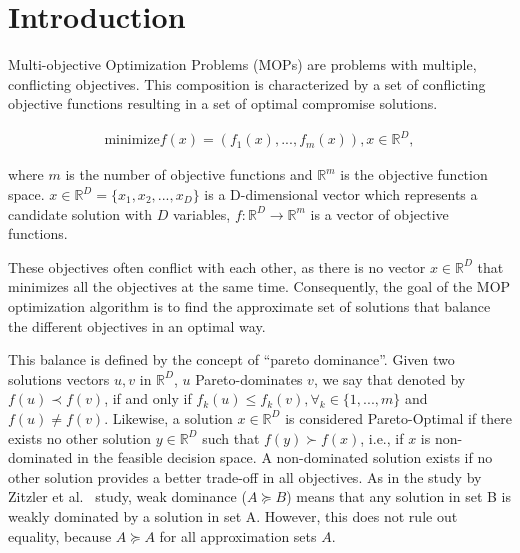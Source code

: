 \section{Introduction}

Multi-objective Optimization Problems (MOPs) are problems with multiple, conflicting objectives. This composition is characterized by a set of conflicting objective functions resulting in a set of optimal compromise solutions. 


\vspace{-1em}
\begin{align}\label{min_problem}
\text{minimize} f(x) = (f_1(x), ..., f_{m}(x)), \text{$x \in \mathbb{R}^{D}$},
\end{align}

where $m$ is the number of objective functions and $\mathbb{R}^m$ is the objective function space. $x \in \mathbb{R}^{D} = \{x_1, x_2, ..., x_D\}$ is a D-dimensional vector which represents a candidate solution with ${D}$ variables, $f: \mathbb{R}^{D} \rightarrow \mathbb{R}^{m}$ is a vector of objective functions.%

These objectives often conflict with each other, as there is no vector $x \in \mathbb{R}^{D}$ that minimizes all the objectives at the same time. Consequently, the goal of the MOP optimization algorithm is to find the approximate set of solutions that balance the different objectives in an optimal way.

This balance is defined by the concept of ``pareto dominance''. Given two solutions vectors $u, v$ in $\mathbb{R}^{D}$, $u$  Pareto-dominates $v$, we say that denoted by $f(u) \prec f(v)$, if and only if $f_k(u) \leq f_k(v), \forall_k \in \{1,..., m\}$ and $ f(u) \neq f(v)$. Likewise, a solution $x \in \mathbb{R}^{D}$ is considered Pareto-Optimal if there exists no other solution $y \in \mathbb{R}^{D}$ such that $f(y) \succ f(x)$, i.e., if $x$ is non-dominated in the feasible decision space. A non-dominated solution exists if no other solution provides a better trade-off in all objectives. As in the study by Zitzler et al.~\cite{zitzler2003performance} study, weak dominance ($A \succeq B$) means that any solution in set B is weakly dominated by a solution in set A. However, this does not rule out equality, because $A \succeq A$ for all approximation sets $A$.

